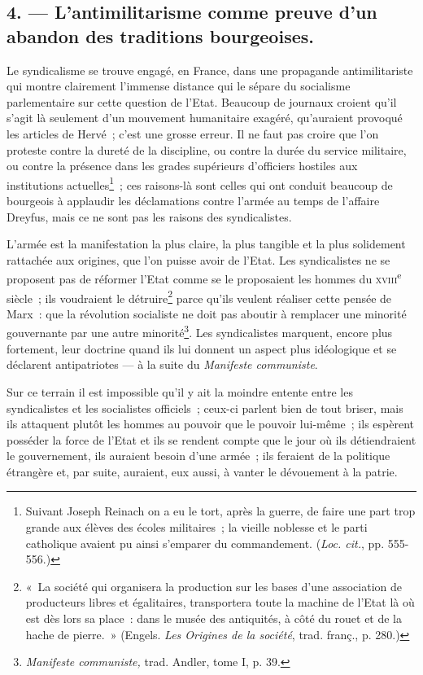 \documentclass[french,twoside]{book} %
\begin{document}
\subsection[{4. — L’antimilitarisme comme preuve d’un abandon des traditions bourgeoises.}]{4. — L’antimilitarisme comme preuve d’un abandon des traditions bourgeoises.}
\label{p14}
\noindent Le syndicalisme se trouve engagé, en France, dans une propagande antimilitariste qui montre clairement l’immense distance qui le sépare du socialisme parlementaire sur cette question de l’Etat. Beaucoup de journaux croient qu’il s’agit là seulement d’un mouvement humanitaire exagéré, qu’auraient provoqué les articles de Hervé ; c’est une grosse erreur. Il ne faut pas croire que l’on proteste contre la dureté de la discipline, ou contre la durée du service militaire, ou contre la présence dans les grades supérieurs d’officiers hostiles aux institutions actuelles\footnote{ \noindent Suivant Joseph Reinach on a eu le tort, après la guerre, de faire une part trop grande aux élèves des écoles militaires ; la vieille noblesse et le parti catholique avaient pu ainsi s’emparer du commandement. (\emph{Loc. cit.}, pp. 555-556.)
 } ;  ces raisons-là sont celles qui ont conduit beaucoup de bourgeois à applaudir les déclamations contre l’armée au temps de l’affaire Dreyfus, mais ce ne sont pas les raisons des syndicalistes.\par
L’armée est la manifestation la plus claire, la plus tangible et la plus solidement rattachée aux origines, que l’on puisse avoir de l’Etat. Les syndicalistes ne se proposent pas de réformer l’Etat comme se le proposaient les hommes du {\scshape xviii}\textsuperscript{e} siècle ; ils voudraient le détruire\footnote{ \noindent « La société qui organisera la production sur les bases d’une association de producteurs libres et égalitaires, transportera toute la machine de l’Etat là où est dès lors sa place : dans le musée des antiquités, à côté du rouet et de la hache de pierre. » (Engels. \emph{Les Origines de la société}, trad. franç., p. 280.)
 } parce qu’ils veulent réaliser cette pensée de Marx : que la révolution socialiste ne doit pas aboutir à remplacer une minorité gouvernante par une autre minorité\footnote{ \noindent \emph{Manifeste communiste,} trad. Andler, tome I, p. 39.
 }. Les syndicalistes marquent, encore plus fortement, leur doctrine quand ils lui donnent un aspect plus idéologique et se déclarent antipatriotes — à la suite du \emph{Manifeste communiste}.\par
Sur ce terrain il est impossible qu’il y ait la moindre entente entre les syndicalistes et les socialistes officiels ; ceux-ci parlent bien de tout briser, mais ils attaquent plutôt les hommes au pouvoir que le pouvoir lui-même ; ils espèrent posséder la force de l’Etat et ils se rendent  compte que le jour où ils détiendraient le gouvernement, ils auraient besoin d’une armée ; ils feraient de la politique étrangère et, par suite, auraient, eux aussi, à vanter le dévouement à la patrie.\par
\end{document}
